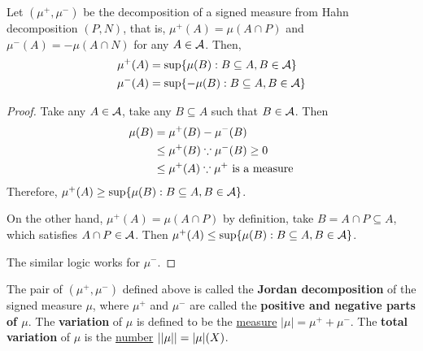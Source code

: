 \documentclass[11pt]{article}
\begin{document}
	\begin{proposition}
		Let $(\mu^+, \mu^-)$ be the decomposition of a signed measure from Hahn decomposition $(P, N)$, that is, $\mu^+(A) = \mu(A \cap P)$ and $\mu^-(A) = - \mu(A \cap N)$ for any $A \in \mathcal{{A}}$. Then,
		\begin{align}
			\mu^+(A) &= \sup\{\mu(B) : B \subseteq A, B \in \mathcal{{A}}\} \\
			\mu^-(A) &= \sup\{-\mu(B) : B \subseteq A, B \in \mathcal{{A}}\}
		\end{align}
		\begin{proof}
			Take any $A \in \mathcal{{A}}$, take any $B \subseteq A$ such that $B \in \mathcal{{A}}$. Then
			\begin{align}
				\mu(B) &= \mu^+(B) - \mu^-(B) \\
				&\leq \mu^+(B) \because \mu^-(B) \geq 0 \\
				&\leq \mu^+(A) \because \mu^+ \text{{ is a measure}}
			\end{align}
			Therefore, $\mu^+(A) \geq \sup\{\mu(B) : B \subseteq A, B \in \mathcal{{A}}\}$.
			
			On the other hand, $\mu^+(A) = \mu(A \cap P)$ by definition, take $B = A \cap P \subseteq A$, which satisfies $A \cap P \in \mathcal{{A}}$. Then $\mu^+(A) \leq \sup\{\mu(B) : B \subseteq A, B \in \mathcal{{A}}\}$.
			
			The similar logic works for $\mu^-$.
		\end{proof}
	\end{proposition}
	
	\begin{definition}
		The pair of $(\mu^+, \mu^-)$ defined above is called the \textbf{Jordan decomposition} of the signed measure $\mu$, where $\mu^+$ and $\mu^-$ are called the \textbf{positive and negative parts of $\mu$}.
		The \textbf{variation} of $\mu$ is defined to be the \ul{measure} $|\mu| = \mu^+ + \mu^-$. The \textbf{total variation} of $\mu$ is the \ul{number} $\vert \vert {\mu} \vert \vert = |\mu|(X)$.
	\end{definition}
	
\end{document}
